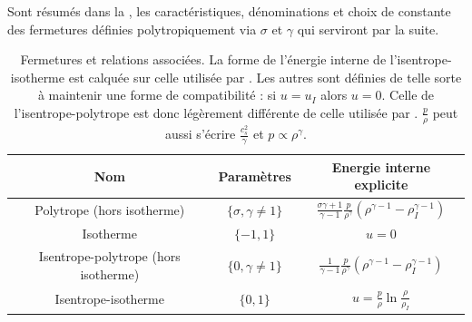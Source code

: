 Sont résumés dans la , les caractéristiques, dénominations et choix de constante des fermetures définies polytropiquement via $\sigma$ et $\gamma$ qui serviront par la suite. 
\begin{table}[!ht]
\begin{center}
\begin{tabular}{ c|c|c } 
Nom & Paramètres & Energie interne explicite\\
\hline
Polytrope (hors isotherme)  & $\{\sigma,\gamma \neq 1 \}$  & $ \frac{\sigma \gamma+1 }{\gamma-1} \frac{p}{\rho^{\gamma}} \left(\rho^{\gamma-1} - \rho_I^{\gamma-1}\right) $    \\
Isotherme  & $\{-1,1\}$ & $  u = 0$     \\
Isentrope-polytrope (hors isotherme) & $\{0,\gamma \neq 1\}$ & $ \frac{1 }{\gamma-1} \frac{p}{\rho^{\gamma}} \left(\rho^{\gamma-1} - \rho_I^{\gamma-1}\right)  $  \\
Isentrope-isotherme & $\{0,1\}$  & $ u = \frac{p}{\rho} \ln \frac{\rho}{\rho_I}$  
\end{tabular}
\end{center}
\caption{Fermetures et relations associées. La forme de l'énergie interne de l'isentrope-isotherme est calquée sur celle utilisée par \cite{galtier_exact_2011}. Les autres sont définies de telle sorte à maintenir une forme de compatibilité : si $u = u_I$ alors $u = 0$. Celle de l'isentrope-polytrope est donc légèrement différente de celle utilisée par \cite{banerjee_kolmogorov-like_2014}. $\frac{p}{\rho}$ peut aussi s'écrire $\frac{c_s^2}{\gamma}$ et $p \propto \rho^{\gamma}$.}\label{tab:fermetures}
\end{table}

